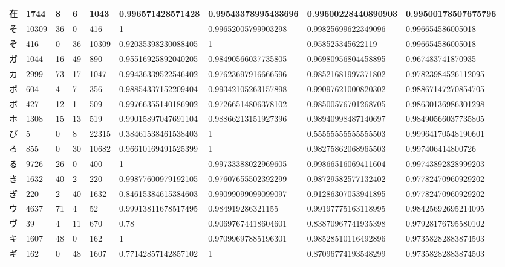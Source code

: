 \begin{table}[H]
\begin{center}
\begin{CJK}{UTF8}{min}
\begin{tabular}{ | l | l | l | l | l | l | l | l | l | }
			在 & 1744 & 8 & 6 & 1043 & 0.996571428571428 & 0.99543378995433696 & 0.99600228440890903 & 0.99500178507675796 \\ \hline
			そ & 10309 & 36 & 0 & 416 & 1 & 0.99652005799903298 & 0.99825699622349096 & 0.996654586005018 \\ \hline
			ぞ & 416 & 0 & 36 & 10309 & 0.92035398230088405 & 1 & 0.958525345622119 & 0.996654586005018 \\ \hline
			ガ & 1044 & 16 & 49 & 890 & 0.95516925892040205 & 0.98490566037735805 & 0.96980956804458895 & 0.967483741870935 \\ \hline
			カ & 2999 & 73 & 17 & 1047 & 0.99436339522546402 & 0.97623697916666596 & 0.98521681997371802 & 0.97823984526112095 \\ \hline
			ポ & 604 & 4 & 7 & 356 & 0.98854337152209404 & 0.99342105263157898 & 0.99097621000820302 & 0.98867147270854705 \\ \hline
			ボ & 427 & 12 & 1 & 509 & 0.99766355140186902 & 0.97266514806378102 & 0.98500576701268705 & 0.98630136986301298 \\ \hline
			ホ & 1308 & 15 & 13 & 519 & 0.99015897047691104 & 0.98866213151927396 & 0.98940998487140697 & 0.98490566037735805 \\ \hline
			ぴ & 5 & 0 & 8 & 22315 & 0.38461538461538403 & 1 & 0.55555555555555503 & 0.99964170548190601 \\ \hline
			ろ & 855 & 0 & 30 & 10682 & 0.96610169491525399 & 1 & 0.98275862068965503 & 0.997406414800726 \\ \hline
			る & 9726 & 26 & 0 & 400 & 1 & 0.99733388022969605 & 0.99866516069411604 & 0.99743892828999203 \\ \hline
			き & 1632 & 40 & 2 & 220 & 0.99877600979192105 & 0.97607655502392299 & 0.98729582577132402 & 0.97782470960929202 \\ \hline
			ぎ & 220 & 2 & 40 & 1632 & 0.84615384615384603 & 0.99099099099099097 & 0.91286307053941895 & 0.97782470960929202 \\ \hline
			ウ & 4637 & 71 & 4 & 52 & 0.99913811678517495 & 0.984919286321155 & 0.99197775163118995 & 0.98425692695214095 \\ \hline
			ヴ & 39 & 4 & 11 & 670 & 0.78 & 0.90697674418604601 & 0.83870967741935398 & 0.97928176795580102 \\ \hline
			キ & 1607 & 48 & 0 & 162 & 1 & 0.97099697885196301 & 0.98528510116492896 & 0.97358282883874503 \\ \hline
			ギ & 162 & 0 & 48 & 1607 & 0.77142857142857102 & 1 & 0.87096774193548299 & 0.97358282883874503 \\ \hline

\end{tabular}
\end{CJK}
\end{center}
\end{table}
